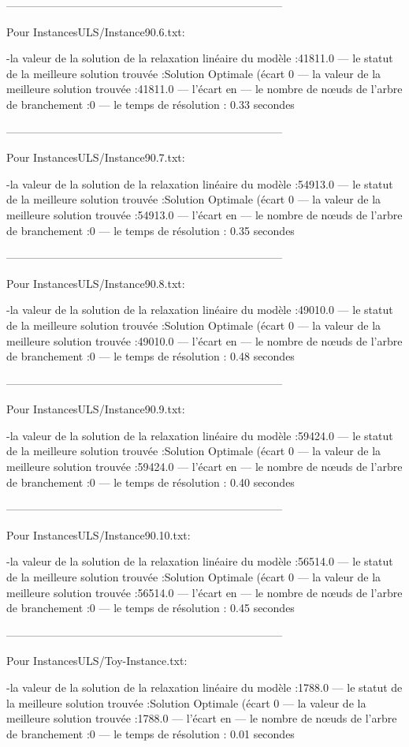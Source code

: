 ---------------------------------------------------------------------------

Pour InstancesULS/Instance90.6.txt:


-la valeur de la solution de la relaxation linéaire du modèle :41811.0
— le statut de la meilleure solution trouvée :Solution Optimale (écart 0%
— la valeur de la meilleure solution trouvée :41811.0
— l’écart en %
— le nombre de nœuds de l’arbre de branchement :0
— le temps de résolution : 0.33 secondes


---------------------------------------------------------------------------

Pour InstancesULS/Instance90.7.txt:


-la valeur de la solution de la relaxation linéaire du modèle :54913.0
— le statut de la meilleure solution trouvée :Solution Optimale (écart 0%
— la valeur de la meilleure solution trouvée :54913.0
— l’écart en %
— le nombre de nœuds de l’arbre de branchement :0
— le temps de résolution : 0.35 secondes


---------------------------------------------------------------------------

Pour InstancesULS/Instance90.8.txt:


-la valeur de la solution de la relaxation linéaire du modèle :49010.0
— le statut de la meilleure solution trouvée :Solution Optimale (écart 0%
— la valeur de la meilleure solution trouvée :49010.0
— l’écart en %
— le nombre de nœuds de l’arbre de branchement :0
— le temps de résolution : 0.48 secondes


---------------------------------------------------------------------------

Pour InstancesULS/Instance90.9.txt:


-la valeur de la solution de la relaxation linéaire du modèle :59424.0
— le statut de la meilleure solution trouvée :Solution Optimale (écart 0%
— la valeur de la meilleure solution trouvée :59424.0
— l’écart en %
— le nombre de nœuds de l’arbre de branchement :0
— le temps de résolution : 0.40 secondes


---------------------------------------------------------------------------

Pour InstancesULS/Instance90.10.txt:


-la valeur de la solution de la relaxation linéaire du modèle :56514.0
— le statut de la meilleure solution trouvée :Solution Optimale (écart 0%
— la valeur de la meilleure solution trouvée :56514.0
— l’écart en %
— le nombre de nœuds de l’arbre de branchement :0
— le temps de résolution : 0.45 secondes


---------------------------------------------------------------------------

Pour InstancesULS/Toy-Instance.txt:


-la valeur de la solution de la relaxation linéaire du modèle :1788.0
— le statut de la meilleure solution trouvée :Solution Optimale (écart 0%
— la valeur de la meilleure solution trouvée :1788.0
— l’écart en %
— le nombre de nœuds de l’arbre de branchement :0
— le temps de résolution : 0.01 secondes
